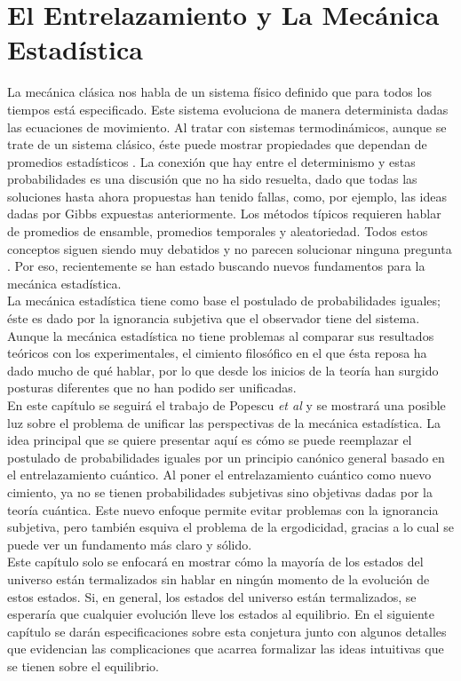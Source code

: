 \chapter{El Entrelazamiento y La Mecánica Estadística} \label{cap:2}

La mecánica clásica nos habla de un sistema físico definido que para todos los tiempos está especificado. Este sistema evoluciona de manera determinista dadas las ecuaciones de movimiento. Al tratar con  sistemas termodinámicos, aunque se trate de un sistema clásico, éste puede mostrar propiedades que dependan de promedios estadísticos \cite{CallenThermo}. La conexión que hay entre el determinismo y estas probabilidades es una discusión que no ha sido resuelta, dado que todas las soluciones hasta ahora propuestas han tenido fallas, como, por ejemplo, las ideas dadas por Gibbs expuestas anteriormente. Los métodos típicos requieren hablar de promedios de ensamble, promedios temporales y aleatoriedad. Todos estos conceptos siguen siendo muy debatidos y no parecen solucionar ninguna pregunta \cite{TodaStat}. Por eso, recientemente se han estado buscando nuevos fundamentos para la mecánica estadística.
\\
La mecánica estadística tiene como base el postulado de probabilidades iguales; éste es dado por la ignorancia subjetiva que el observador tiene del sistema. Aunque la mecánica estadística no tiene problemas al comparar sus resultados teóricos con los experimentales, el cimiento filosófico en el que ésta reposa ha dado mucho de qué hablar, por lo que desde los inicios de la teoría han surgido posturas diferentes que no han podido ser unificadas. 
\\
En este capítulo se seguirá el trabajo de Popescu \textit{et al}  \cite{Popescu2006} y se mostrará una posible luz sobre el problema de unificar las perspectivas de la mecánica estadística. La idea principal que se quiere presentar aquí es cómo se puede reemplazar el postulado de probabilidades iguales por un principio canónico general basado en el entrelazamiento cuántico. Al poner el entrelazamiento cuántico como nuevo cimiento, ya no se tienen probabilidades subjetivas sino objetivas dadas por la teoría cuántica. Este nuevo enfoque permite evitar problemas con la ignorancia subjetiva, pero también esquiva el problema de la ergodicidad, gracias a lo cual se puede ver un fundamento más claro y sólido. 
\\
Este capítulo solo se enfocará en mostrar cómo la mayoría de los estados del universo están termalizados sin hablar en ningún momento de la evolución de estos estados. Si, en general, los estados del universo están termalizados, se esperaría que cualquier evolución lleve los estados al equilibrio. En el siguiente capítulo se darán especificaciones sobre esta conjetura junto con algunos detalles que evidencian las complicaciones que acarrea formalizar las ideas intuitivas que se tienen sobre el equilibrio.
\\
